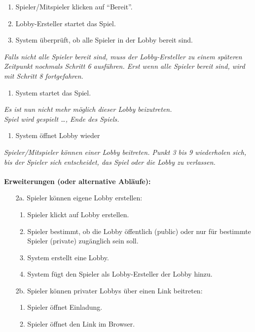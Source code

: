 \documentclass[11pt,ngerman]{article}
\newcommand{\quotes}[1]{``#1''}
\begin{document}
\begin{tcolorbox}
\begin{enumerate}
    		\item Spieler/Mitspieler klicken auf \quotes{Bereit}.
    		\item Lobby-Ersteller startet das Spiel.
    		\item System überprüft, ob alle Spieler in der \Gls{Lobby} bereit sind.
    	\end{enumerate}
    	\textit{Falls nicht alle Spieler bereit sind, muss der Lobby-Ersteller zu einem späteren Zeitpunkt nochmals Schritt 6 ausführen. Erst wenn alle Spieler bereit sind, wird mit Schritt 8 fortgefahren.}
    	\begin{enumerate}[resume]
    		\item System startet das Spiel.
    	\end{enumerate}
    	\textit{Es ist nun nicht mehr möglich dieser \Gls{Lobby} beizutreten.} \\
    	\textit{Spiel wird gespielt …, Ende des Spiels.}
    	\begin{enumerate}[resume]
    		\item System öffnet \Gls{Lobby} wieder
    	\end{enumerate}
    	\textit{Spieler/Mitspieler können einer \Gls{Lobby} beitreten. Punkt 3 bis 9 wiederholen sich, bis der Spieler sich entscheidet, das Spiel oder die \Gls{Lobby} zu verlassen.} \\
    	\\ \textbf{Erweiterungen (oder alternative Abläufe):}
    	\begin{itemize}
    		\item[2a.] Spieler können eigene \Gls{Lobby} erstellen:
    		\begin{enumerate}
    			\item Spieler klickt auf \Gls{Lobby} erstellen.
    			\item Spieler bestimmt, ob die \Gls{Lobby} öffentlich (public) oder nur für bestimmte Spieler (private) zugänglich sein soll.
    			\item System erstellt eine \Gls{Lobby}.
    			\item System fügt den Spieler als Lobby-Ersteller der \Gls{Lobby} hinzu.
    		\end{enumerate}
    		\item[2b.] Spieler können privater \Glspl{Lobby} über einen Link beitreten:
    		\begin{enumerate}
    			\item Spieler öffnet Einladung.
    			\item Spieler öffnet den Link im Browser.

\end{enumerate}
\end{itemize}
\end{tcolorbox}
\end{document}

